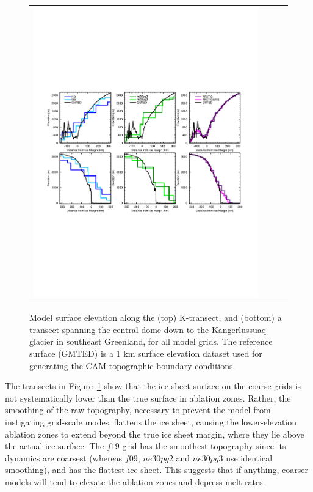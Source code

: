 \documentclass[draft]{agujournal2019}
\begin{document}
\begin{figure}[t]
\begin{center}
\begin{tabular}{cccc}
         \includegraphics[width=130mm]{figs/temp_zsects.pdf}
\end{tabular}
\end{center}
\caption{Model surface elevation along the (top) K-transect, and (bottom) a transect spanning the central dome down to the Kangerlussuaq glacier in southeast Greenland, for all model grids. The reference surface (GMTED) is a 1 km surface elevation dataset used for generating the CAM topographic boundary conditions. }
\label{fig:ztrans}
\end{figure}

The transects in Figure~\ref{fig:ztrans} show that the ice sheet surface on the coarse grids is not systematically lower than the true surface in ablation zones. Rather, the smoothing of the raw topography, necessary to prevent the model from instigating grid-scale modes, flattens the ice sheet, causing the lower-elevation ablation zones to extend beyond the true ice sheet margin, where they lie above the actual ice surface. The $f19$ grid has the smoothest topography since its dynamics are coarsest (whereas $f09$, $ne30pg2$ and $ne30pg3$ use identical smoothing), and has the flattest ice sheet. This suggests that if anything, coarser models will tend to elevate the ablation zones and depress melt rates.
\end{document}
